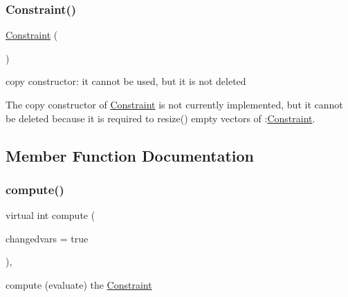 \subsubsection{\texorpdfstring{Constraint()}{Constraint()}\hspace{0.1cm}{\footnotesize\ttfamily [2/2]}}
{\footnotesize\ttfamily \mbox{\hyperlink{class_s_m_spp__di__unipi__it_1_1_constraint}{Constraint}} (\begin{DoxyParamCaption}\item[{const \mbox{\hyperlink{class_s_m_spp__di__unipi__it_1_1_constraint}{Constraint}} \&}]{ }\end{DoxyParamCaption})\hspace{0.3cm}{\ttfamily [inline]}}



copy constructor\+: it cannot be used, but it is not deleted 

The copy constructor of \mbox{\hyperlink{class_s_m_spp__di__unipi__it_1_1_constraint}{Constraint}} is not currently implemented, but it cannot be deleted because it is required to resize() empty vectors of \+:\mbox{\hyperlink{class_s_m_spp__di__unipi__it_1_1_constraint}{Constraint}}. 

\subsection{Member Function Documentation}
\mbox{\label{class_s_m_spp__di__unipi__it_1_1_constraint_a504d4e3e174c7a518cc66156a8a45ce5}} 
\subsubsection{\texorpdfstring{compute()}{compute()}}
{\footnotesize\ttfamily virtual int compute (\begin{DoxyParamCaption}\item[{bool}]{changedvars = {\ttfamily true} }\end{DoxyParamCaption})\hspace{0.3cm}{\ttfamily [override]}, {}}



compute (evaluate) the \mbox{\hyperlink{class_s_m_spp__di__unipi__it_1_1_constraint}{Constraint}} 

